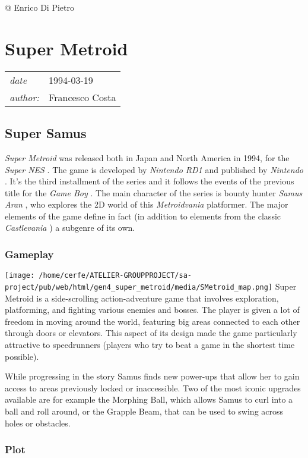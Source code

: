 \documentclass[a4paper,10pt]{book}
\newcommand{\pageHeader}[4]{
    \section{#1}
    \vspace{-0.3cm}
    \begin{table}[h!]
     \begin{tabular}{ll}
        \hline
        \textit{date} & #2 \\
        \textit{author: } & #3\\
        \hline
     \end{tabular}
    \end{table}
    \vspace{-0.3cm}
}
\begin{document}
 
 
 
 
 
 @ Enrico Di Pietro 
 
 \newpage\pageHeader{Super Metroid}{1994-03-19}{Francesco Costa}{The SNES member of the Metroid series}
 \subsection{Super Samus }
 
 \textit{Super Metroid } was released both in Japan and North America in
          1994, for the  \textit{Super NES }. The game is developed by  \textit{Nintendo
          RD1 } and published by  \textit{Nintendo }. It's the third installment
          of the series and it follows the events of the previous title for the
           \textit{Game Boy }. The main character of the series is bounty hunter
           \textit{Samus Aran }, who explores the 2D world of this  \textit{Metroidvania }
          platformer. The major elements of the game define in fact (in addition
          to elements from the classic  \textit{Castlevania }) a subgenre of its own.
         
 
 \subsubsection{Gameplay }
 
 \texttt{[image: /home/cerfe/ATELIER-GROUPPROJECT/sa-project/pub/web/html/gen4\_super\_metroid/media/SMetroid\_map.png]}
          Super Metroid is a side-scrolling action-adventure game that involves
          exploration, platforming, and fighting various enemies and bosses. The
          player is given a lot of freedom in moving around the world, featuring
          big areas connected to each other through doors or elevators. This aspect
          of its design made the game particularly attractive to speedrunners
          (players who try to beat a game in the shortest time possible).
           
          While progressing in the story Samus finds new power-ups that allow
          her to gain access to areas previously locked or inaccessible. Two of
          the most iconic upgrades available are for example the Morphing Ball,
          which allows Samus to curl into a ball and roll around, or the Grapple
          Beam, that can be used to swing across holes or obstacles.
         
 
 \subsubsection{Plot }
 
\end{document}
